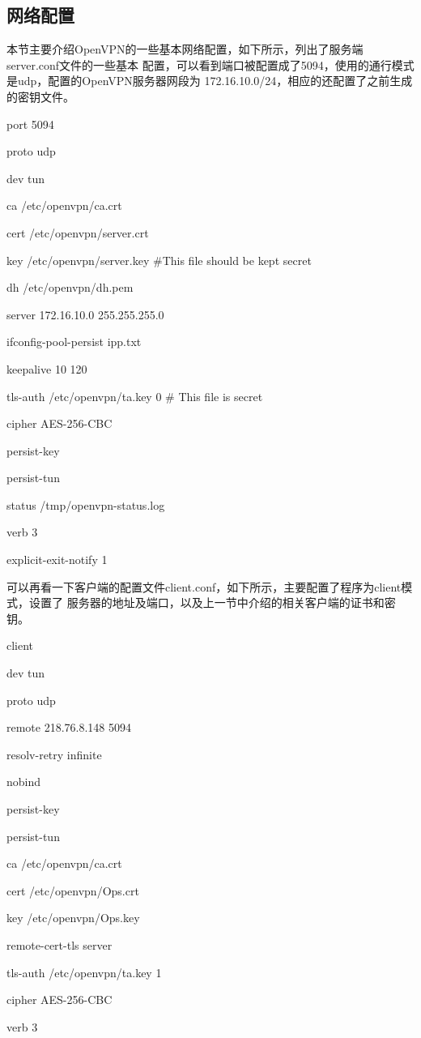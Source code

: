 \documentclass[a4paper,12pt]{report}
\begin{document}
\begin{spacing}{1.5}
\subsection{网络配置}
本节主要介绍OpenVPN的一些基本网络配置，如下所示，列出了服务端server.conf文件的一些基本
配置，可以看到端口被配置成了5094，使用的通行模式是udp，配置的OpenVPN服务器网段为
172.16.10.0/24，相应的还配置了之前生成的密钥文件。

\begin{tcolorbox}[notitle,boxrule=0pt,colback=gray!20,colframe=gray!20]
port 5094

proto udp

dev tun

ca /etc/openvpn/ca.crt

cert /etc/openvpn/server.crt

key /etc/openvpn/server.key  \#This file should be kept secret

dh /etc/openvpn/dh.pem

server 172.16.10.0 255.255.255.0

ifconfig-pool-persist ipp.txt

keepalive 10 120

tls-auth /etc/openvpn/ta.key 0 \# This file is secret

cipher AES-256-CBC

persist-key

persist-tun

status /tmp/openvpn-status.log

verb 3

explicit-exit-notify 1
\end{tcolorbox}

可以再看一下客户端的配置文件client.conf，如下所示，主要配置了程序为client模式，设置了
服务器的地址及端口，以及上一节中介绍的相关客户端的证书和密钥。

\begin{tcolorbox}[notitle,boxrule=0pt,colback=gray!20,colframe=gray!20]
client

dev tun

proto udp

remote 218.76.8.148 5094

resolv-retry infinite

nobind

persist-key

persist-tun

ca /etc/openvpn/ca.crt

cert /etc/openvpn/Ops.crt

key /etc/openvpn/Ops.key

remote-cert-tls server

tls-auth /etc/openvpn/ta.key 1

cipher AES-256-CBC

verb 3

\end{tcolorbox}


\end{spacing}
\end{document}
